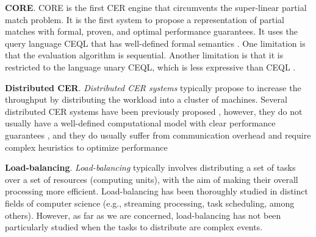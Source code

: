 \textbf{CORE}. CORE \cite{core} is the first CER engine that circumvents the super-linear partial match problem. It is the first system to propose a representation of partial matches with formal, proven, and optimal performance guarantees. It uses the query language CEQL that has well-defined formal semantics \cite{on-the-expressiveness}. One limitation is that the evaluation algorithm is sequential. Another limitation is that it is restricted to the language unary CEQL, which is less expressive than CEQL \cite{on-the-expressiveness}.

\textbf{Distributed CER}. \emph{Distributed CER systems} typically propose to increase the throughput by distributing the workload into a cluster of machines. Several distributed CER systems have been previously proposed \cite{esper, flink-cep, next-cep, distributed-related-work-1, distributed-related-work-2}, however, they do not usually have a well-defined computational model with clear performance guarantees \cite{distributed-related-work-1}, and they do usually suffer from communication overhead and require complex heuristics to optimize performance \cite{distributed-related-work-2}

\textbf{Load-balancing}. \emph{Load-balancing} typically involves distributing a set of tasks over a set of resources (computing units), with the aim of making their overall processing more efficient. Load-balancing has been thoroughly studied \cite{load-balancing-1, load-balancing-2, load-balancing-3} in distinct fields of computer science (e.g., streaming processing, task scheduling, among others). However, as far as we are concerned, load-balancing has not been particularly studied when the tasks to distribute are complex events.
